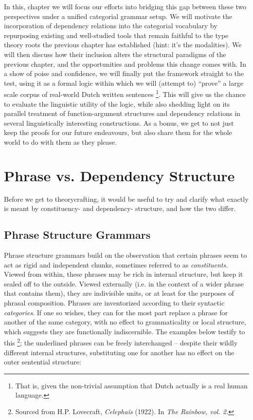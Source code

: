 In this, chapter we will focus our efforts into bridging this gap between these two perspectives under a unified categorial grammar setup.
We will motivate the incorporation of dependency relations into the categorial vocabulary by repurposing existing and well-studied tools that remain faithful to the type theory roots the previous chapter has established (hint: it's the modalities).
We will then discuss how their inclusion alters the structural paradigms of the previous chapter, and the opportunities and problems this change comes with.
In a show of poise and confidence, we will finally put the framework straight to the test, using it as a formal logic within which we will (attempt to) ``prove'' a large scale corpus of real-world Dutch written sentences%
	\footnote{That is, given the non-trivial assumption that Dutch actually is a real human language.}.
This will give us the chance to evaluate the linguistic utility of the logic, while also shedding light on its parallel treatment of function-argument structures and dependency relations in several linguistically interesting constructions.
As a bonus, we get to not just keep the proofs for our future endeavours, but also share them for the whole world to do with them as they please.

\section{Phrase vs. Dependency Structure}
Before we get to theorycrafting, it would be useful to try and clarify what exactly is meant by constituency- and dependency- structure, and how the two differ.

\subsection{Phrase Structure Grammars}
Phrase structure grammars build on the observation that certain phrases seem to act as rigid and independent chunks, sometimes referred to as \textit{constituents}. 
Viewed from within, these phrases may be rich in internal structure, but keep it sealed off to the outside.
Viewed externally (i.e. in the context of a wider phrase that contains them), they are indivisible units, or at least for the purposes of phrasal composition.
Phrases are inventorized according to their syntactic \textit{categories}.
If one so wishes, they can for the most part replace a phrase for another of the same category, with no effect to grammaticality or local structure, which suggests they are functionally indiscernible.
The examples below testify to this%
\footnote{Sourced from H.P. Lovecraft, \textit{Celepha\"{i}s}  (1922). In \textit{The Rainbow, vol. 2.}}; the underlined phrases can be freely interchanged -- despite their wildly different internal structures, substituting one for another has no effect on the outer sentential structure:

